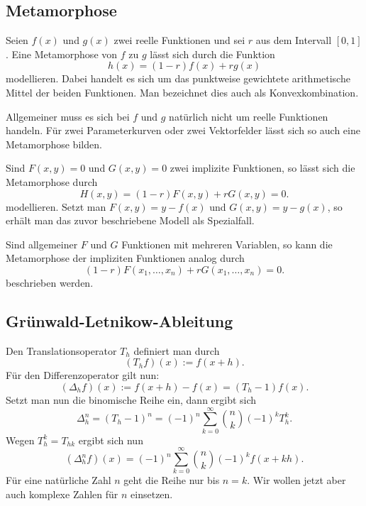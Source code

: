 \documentclass[a4paper,10pt,fleqn,twocolumn,twoside,dvipdfmx]{scrartcl}
\numberwithin{equation}{section}
\theoremstyle{rmbox}
\begin{document}
\subsection{Metamorphose}

Seien $f(x)$ und $g(x)$ zwei reelle Funktionen und sei $r$ aus
dem Intervall $[0,1]$. Eine Metamorphose von $f$ zu $g$
lässt sich durch die Funktion
\begin{equation}
h(x) = (1-r)f(x)+rg(x)
\end{equation}
modellieren. Dabei handelt es sich um das punktweise gewichtete
arithmetische Mittel der beiden Funktionen. Man bezeichnet dies
auch als Konvexkombination.

Allgemeiner muss es sich bei $f$ und $g$ natürlich nicht um reelle
Funktionen handeln. Für zwei Parameterkurven oder  zwei Vektorfelder
lässt sich so auch eine Metamorphose bilden.

Sind $F(x,y)=0$ und $G(x,y)=0$ zwei implizite Funktionen, so
lässt sich die Metamorphose durch
\begin{equation}
H(x,y) = (1-r)F(x,y)+rG(x,y) = 0.
\end{equation}
modellieren. Setzt man $F(x,y)=y-f(x)$ und $G(x,y)=y-g(x)$,
so erhält man das zuvor beschriebene Modell als Spezialfall.

Sind allgemeiner $F$ und $G$ Funktionen mit mehreren
Variablen, so kann die Metamorphose der impliziten Funktionen
analog durch
\begin{equation}
(1-r)F(x_1,\ldots,x_n)+rG(x_1,\ldots,x_n)=0.
\end{equation}
beschrieben werden.

\subsection{Grünwald-Letnikow-Ableitung}

Den Translationsoperator $T_h$ definiert man durch
\begin{equation}
(T_h f)(x) := f(x+h).
\end{equation}
Für den Differenzoperator gilt nun:
\begin{equation}
(\Delta_h f)(x) := f(x+h)-f(x) = (T_h-1) f(x).
\end{equation}
Setzt man nun die binomische Reihe ein, dann ergibt sich%
\begin{equation}
\Delta_h^n = (T_h-1)^n
= (-1)^n \sum_{k=0}^\infty \binom{n}{k} (-1)^k T_h^k.
\end{equation}
Wegen $T_h^k = T_{hk}$ ergibt sich nun
\begin{equation}
(\Delta_h^n f)(x) = (-1)^n \sum_{k=0}^\infty \binom{n}{k} (-1)^k f(x+kh).
\end{equation}
Für eine natürliche Zahl $n$ geht die Reihe nur bis $n=k$. Wir wollen
jetzt aber auch komplexe Zahlen für $n$ einsetzen.
\end{document}
